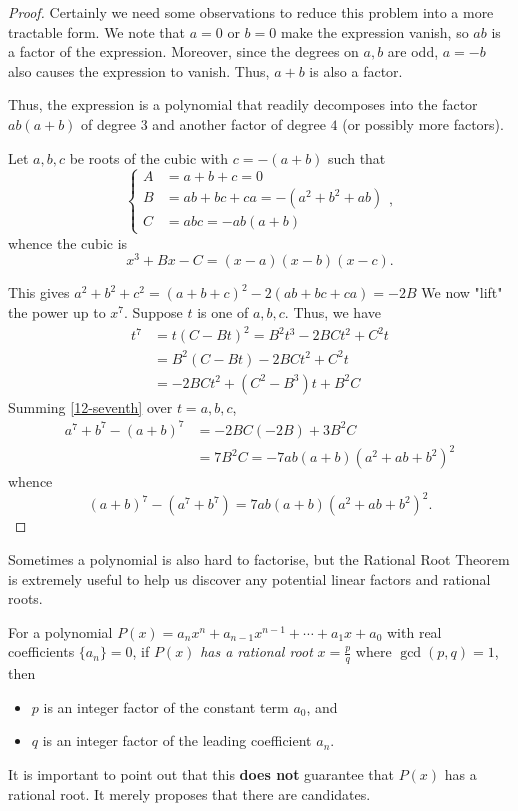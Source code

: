 \documentclass[../main.tex]{subfiles}
\begin{document}
\begin{proof}
    Certainly we need some observations to reduce this problem into a more tractable form. We note that $a=0$ or $b=0$ make the expression vanish, so $ab$ is a factor of the expression. Moreover, since the degrees on $a, b$ are odd, $a=-b$ also causes the expression to vanish. Thus, $a+b$ is also a factor.

    Thus, the expression is a polynomial that readily decomposes into the factor $ab(a+b)$ of degree $3$ and another factor of degree $4$ (or possibly more factors).

    Let $a,b,c$ be roots of the cubic with $c=-(a+b)$ such that
    $$\begin{cases}
        A&=a+b+c=0 \\
        B&=ab+bc+ca=-(a^2+b^2+ab) \\
        C&=abc=-ab(a+b)
    \end{cases},$$
    whence the cubic is $$x^3+Bx-C=(x-a)(x-b)(x-c).$$
    
    This gives $a^2+b^2+c^2=(a+b+c)^2-2(ab+bc+ca)=-2B$
    We now "lift" the power up to $x^7$. Suppose $t$ is one of $a,b,c$. Thus, we have
    \begin{align}
        t^7&=t(C-Bt)^2=B^2t^3-2BCt^2+C^2t \\
        &=B^2(C-Bt)-2BCt^2+C^2t \\
        &=-2BCt^2+(C^2-B^3)t+B^2C \label{12-seventh}
    \end{align}
    Summing \eqref{12-seventh} over $t=a,b,c$,
    \begin{align*}
        a^7+b^7-(a+b)^7&=-2BC(-2B)+3B^2C\\
        &=7B^2C=-7ab(a+b)(a^2+ab+b^2)^2
    \end{align*}
    whence $$(a+b)^7-(a^7+b^7)=7ab(a+b)(a^2+ab+b^2)^2.$$
\end{proof}

Sometimes a polynomial is also hard to factorise, but the Rational Root Theorem is extremely useful to help us discover any potential linear factors and rational roots.
\begin{proposition}
For a polynomial $P(x)=a_nx^n+a_{n-1}x^{n-1}+\cdots+a_1x+a_0$ with real coefficients $\{a_n\}=0$, if $P(x)$ \textit{has a rational root} $x=\frac{p}{q}$ where $\gcd(p,q)=1$, then
\begin{itemize}
    \item $p$ is an integer factor of the constant term $a_0$, and
    \item $q$ is an integer factor of the leading coefficient $a_n$.
\end{itemize}
It is important to point out that this \textbf{does not} guarantee that $P(x)$ has a rational root. It merely proposes that there are candidates.
\end{proposition}
\end{document}
